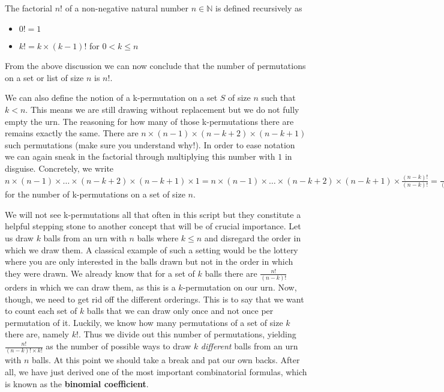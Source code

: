 \documentclass[a4paper,11pt,leqno]{report}
\begin{document}
\begin{Definition} The factorial $ n! $ of a non-negative natural number $ n \in \mathbb{N} $ is defined recursively as 
\begin{itemize}
\item $ 0! = 1 $
\item $ k! = k\times (k-1)! $ for $ 0 < k \leq n $
\end{itemize}
\end{Definition}

From the above discussion we can now conclude that the number of permutations on a set or list of size $ n $
is $ n! $. 

We can also define the notion of a k-permutation on a set $ S $ of size $ n $ such that $ k < n $.
This means we are still drawing without replacement but we do not fully empty the urn. The reasoning for how
many of those k-permutations there are remains exactly the same. There are $ n \times (n-1) \times (n-k+2) 
\times (n-k+1) $ such permutations (make sure you understand why!). In order to ease notation we can again
sneak in the factorial through multiplying this number with $ 1 $ in disguise. Concretely, we write
$ n \times (n-1) \times \ldots \times (n-k+2) \times (n-k+1) \times 1 = n \times (n-1) \times \ldots \times (n-k+2) \times (n-k+1) \times 
\frac{(n-k)!}{(n-k)!}
= \frac{n!}{(n-k)!} $ for the number of k-permutations on a set of size $ n $.

We will not see k-permutations all that often in this script but they constitute a helpful stepping stone to another
concept that will be of crucial importance. Let us draw $ k $ balls from an urn with $ n $ balls where $ k \leq n $ and disregard
the order in which we draw them. A classical example of such a setting would be the lottery where you are only interested in the
balls drawn but not in the order in which they were drawn. We already know that for a set of $ k $ balls there are $ \frac{n!}{(n-k)!} $ 
orders in which we can draw them, as this is a $ k $-permutation on our urn. Now, though, we need to get rid off the different 
orderings. This is to say that we want to count each set of $ k $ balls that we can draw only once and not once per permutation of it.
Luckily, we know how many permutations of a set of size $ k $ there are, namely $ k! $. Thus we divide out this number of permutations,
yielding $ \frac{n!}{(n-k)!\times k!} $ as the number of possible ways to draw $ k $ \textit{different} balls from an urn with $ n $
balls.
At this point we should take a break and pat our own backs. After all, we have just derived one of the most important combinatorial 
formulas, which is known as the \textbf{binomial coefficient}.
\end{document}
